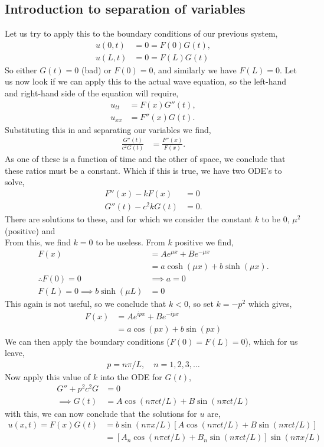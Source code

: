 \documentclass[11pt,a4paper]{report}
\theoremstyle{definition}
\begin{document}
\subsection{Introduction to separation of variables}
Let us try to apply this to the boundary conditions of our previous system,
\begin{align*}
	u(0,t) &= 0 = F(0) G(t), \\
	u(L,t) &= 0 = F(L) G(t)
\end{align*}
So either $G(t)=0$ (bad) or $F(0)=0$, and similarly we have $F(L)=0$. Let us now look if we can apply this to the actual wave equation, so the left-hand and right-hand side of the equation will require,
\begin{align*}
	u_{tt} &= F(x) G''(t),\\
	u_{xx} &= F''(x) G(t). 
\end{align*}
Substituting this in and separating our variables we find,
\begin{align*}
	\frac{G''(t)}{c^2 G(t)} &= \frac{F''(x)}{F(x)}.
\end{align*}
As one of these is a function of time and the other of space, we conclude that these ratios must be a constant. Which if this is true, we have two ODE's to solve,
\begin{align*}
	F''(x) - kF(x) &= 0 \\
	G''(t) - c^2k G(t) &= 0.
\end{align*}
There are solutions to these, and for which we consider the constant $k$ to be $0$, $\mu^2$ (positive) and \\

From this, we find $k=0$ to be useless. From $k$ positive we find,
\begin{align*}
	F(x)&= Ae^{\mu x} + Be^{-\mu x}\\
	    &= a \cosh (\mu x) + b \sinh (\mu x). \\
\therefore F(0) = 0 &\implies a = 0 \\
F(L) = 0 \implies b\sinh(\mu L) &= 0
\end{align*}
This again is not useful, so we conclude that $k<0$, so set $k=-p^2$ which gives,
\begin{align*}
	F(x)&= Ae^{ipx} + Be^{-ipx} \\
		&= a\cos(px) + b\sin(px)
\end{align*}
We can then apply the boundary conditions ($F(0)=F(L)=0$), which for us leave,
\begin{align*}
	p = n\pi / L, \quad n=1,2,3,\dots
\end{align*}
Now apply this value of $k$ into the ODE for $G(t)$,
\begin{align*}
	G'' + p^2 c^2 G &= 0 \\
	\implies G(t) &= A \cos(n\pi c t/L) + B \sin(n\pi ct/L)
\end{align*}
with this, we can now conclude that the solutions for $u$ are,
\begin{align*}
 u(x,t) = F(x)G(t) &= b\sin(n\pi x/L) [A \cos(n\pi c t/L) + B \sin(n\pi ct/L)] \\
 				   &= [A_n \cos(n\pi c t/L) + B_n \sin(n\pi ct/L)] \sin(n\pi x/L)
\end{align*}
\end{document}
